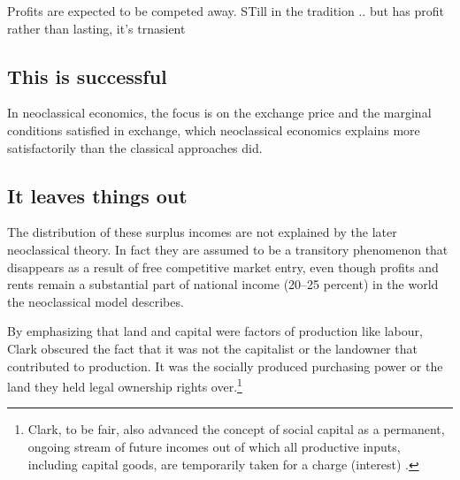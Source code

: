  

 Profits are expected to be competed away.
 STill in the tradition .. but has profit rather than lasting, it's trnasient

\subsection{This is successful}

In neoclassical economics, the focus is on the exchange price and the marginal conditions satisfied in exchange, which neoclassical economics explains more satisfactorily than the classical approaches did.  

\subsection{It leaves things out}


The distribution of these surplus incomes are not explained by the later neoclassical theory. In fact they are assumed to be a transitory phenomenon that disappears as a result of free competitive market entry, even though profits and rents remain a substantial part of national income (20--25 percent) \cite{GET_Britannica} %
in the world the neoclassical model describes. 

By emphasizing that land and capital were factors of production like labour, Clark obscured the fact that it was not the capitalist or the landowner that contributed to production. It was the socially produced purchasing power or the land they held legal ownership rights over.\footnote{Clark, to be fair, also advanced the concept of social capital as a permanent, ongoing stream of future incomes out of which all productive inputs, including capital goods, are temporarily taken for a charge (interest) \cite{CLARKBRITANICA}. %
}

